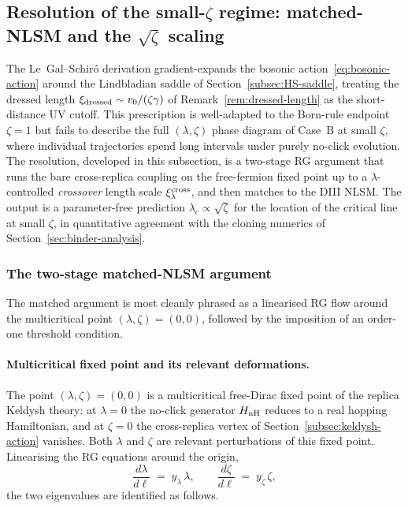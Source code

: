 \subsection{Resolution of the small-$\zeta$ regime: matched-NLSM
            and the $\sqrt{\zeta}$ scaling}
\label{subsec:matching}

The Le~Gal--Schir\'o derivation gradient-expands the bosonic
action~\eqref{eq:bosonic-action} around the Lindbladian saddle of
Section~\ref{subsec:HS-saddle}, treating the dressed length
$\xi_{\rm dressed}\sim v_0/(\zeta\gamma)$ of
Remark~\ref{rem:dressed-length} as the short-distance UV cutoff.  This
prescription is well-adapted to the Born-rule endpoint $\zeta=1$ but
fails to describe the full $(\lambda,\zeta)$ phase diagram of
Case~B at small $\zeta$, where individual trajectories spend long
intervals under purely no-click evolution.  The resolution, developed
in this subsection, is a two-stage RG argument that runs the bare
cross-replica coupling on the free-fermion fixed point up to a
$\lambda$-controlled \emph{crossover} length scale $\xi_\lambda^{\rm
cross}$, and then matches to the DIII NLSM.  The output is a
parameter-free prediction $\lambda_c\propto\sqrt{\zeta}$ for the
location of the critical line at small $\zeta$, in quantitative
agreement with the cloning numerics of
Section~\ref{sec:binder-analysis}.

\subsubsection{The two-stage matched-NLSM argument}
\label{subsubsec:two-stage}

The matched argument is most cleanly phrased as a linearised RG flow
around the multicritical point
$(\lambda,\zeta)=(0,0)$, followed by the imposition of an order-one
threshold condition.

\paragraph{Multicritical fixed point and its relevant deformations.}
The point $(\lambda,\zeta)=(0,0)$ is a multicritical free-Dirac fixed
point of the replica Keldysh theory: at $\lambda=0$ the no-click
generator $H_{\rm nH}$ reduces to a real hopping Hamiltonian, and at
$\zeta=0$ the cross-replica vertex of Section~\ref{subsec:keldysh-action}
vanishes.  Both $\lambda$ and $\zeta$ are relevant
perturbations of this fixed point.  Linearising the RG equations
around the origin,
\begin{equation}\label{eq:RG-linear}
  \frac{d\lambda}{d\ell}\;=\; y_\lambda \,\lambda,
  \qquad
  \frac{d\zeta}{d\ell}\;=\; y_\zeta \,\zeta,
\end{equation}
the two eigenvalues are identified as follows.

